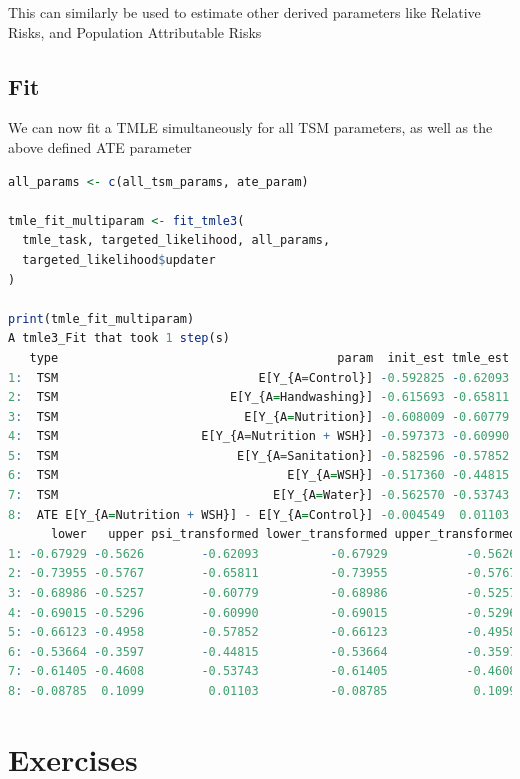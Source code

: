 \documentclass[
  12pt, krantz2,
]{krantz}
\newcommand{\1}{\mathbbm{1}}
\theoremstyle{definition}
\theoremstyle{definition}
\theoremstyle{definition}
\theoremstyle{definition}
\theoremstyle{remark}
\begin{document}
This can similarly be used to estimate other derived parameters like Relative
Risks, and Population Attributable Risks

\hypertarget{fit}{%
\subsection{Fit}\label{fit}}

We can now fit a TMLE simultaneously for all TSM parameters, as well as the
above defined ATE parameter

\begin{lstlisting}[language=R]
all_params <- c(all_tsm_params, ate_param)

tmle_fit_multiparam <- fit_tmle3(
  tmle_task, targeted_likelihood, all_params,
  targeted_likelihood$updater
)

print(tmle_fit_multiparam)
A tmle3_Fit that took 1 step(s)
   type                                       param  init_est tmle_est      se
1:  TSM                            E[Y_{A=Control}] -0.592825 -0.62093 0.02978
2:  TSM                        E[Y_{A=Handwashing}] -0.615693 -0.65811 0.04155
3:  TSM                          E[Y_{A=Nutrition}] -0.608009 -0.60779 0.04187
4:  TSM                    E[Y_{A=Nutrition + WSH}] -0.597373 -0.60990 0.04095
5:  TSM                         E[Y_{A=Sanitation}] -0.582596 -0.57852 0.04220
6:  TSM                                E[Y_{A=WSH}] -0.517360 -0.44815 0.04515
7:  TSM                              E[Y_{A=Water}] -0.562570 -0.53743 0.03909
8:  ATE E[Y_{A=Nutrition + WSH}] - E[Y_{A=Control}] -0.004549  0.01103 0.05045
      lower   upper psi_transformed lower_transformed upper_transformed
1: -0.67929 -0.5626        -0.62093          -0.67929           -0.5626
2: -0.73955 -0.5767        -0.65811          -0.73955           -0.5767
3: -0.68986 -0.5257        -0.60779          -0.68986           -0.5257
4: -0.69015 -0.5296        -0.60990          -0.69015           -0.5296
5: -0.66123 -0.4958        -0.57852          -0.66123           -0.4958
6: -0.53664 -0.3597        -0.44815          -0.53664           -0.3597
7: -0.61405 -0.4608        -0.53743          -0.61405           -0.4608
8: -0.08785  0.1099         0.01103          -0.08785            0.1099
\end{lstlisting}

\hypertarget{exercises-2}{%
\section{Exercises}\label{exercises-2}}
\end{document}
